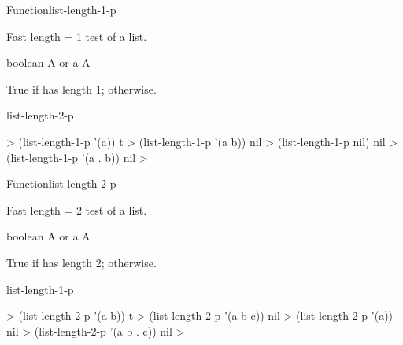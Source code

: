 \documentclass[10pt,twoside,english,pdftex]{article}
\begin{document}
\begin{functiondoc}{Function}{list-length-1-p}%
  { 
    \returns{} }
%
%

\fnsyntax

\fnpurpose Fast length = 1 test of a list.

\fnpackage {}

\fnmodule {}

\fnargs
\begin{args}{boolean}
\arg[list] A  or a 
\arg[boolean] A 
\end{args}

\fnreturns True if  has length 1; \nil{} otherwise.

\begin{alsos}{list-length-2-p}
\end{alsos}

\fnexamples
%
\W\supp
\begin{example}
  > (list-length-1-p '(a))
  t
  > (list-length-1-p '(a b))
  nil
  > (list-length-1-p nil)
  nil
  > (list-length-1-p '(a . b))
  nil
  >
\end{example}

\end{functiondoc}


\begin{functiondoc}{Function}{list-length-2-p}%
  {
    \returns{} }
%
%

\fnsyntax

\fnpurpose Fast length = 2 test of a list.

\fnpackage {}

\fnmodule {}

\fnargs
\begin{args}{boolean}
\arg[list] A  or a 
\arg[boolean] A 
\end{args}

\fnreturns True if  has length 2; \nil{} otherwise.

\begin{alsos}{list-length-1-p}
\end{alsos}

\fnexamples
%
\W\supp
\begin{example}
  > (list-length-2-p '(a b))
  t
  > (list-length-2-p '(a b c))
  nil
  > (list-length-2-p '(a))
  nil
  > (list-length-2-p '(a b . c))
  nil
  >
\end{example}

\end{functiondoc}
\end{document}
